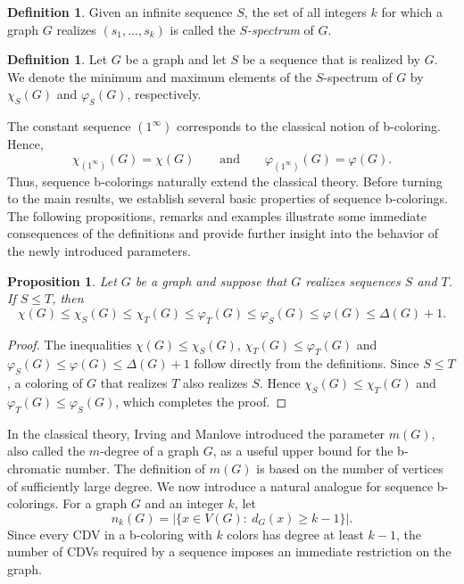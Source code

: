 \documentclass{article}
\newtheorem{proposition}[theorem]{Proposition}
\theoremstyle{definition}
\newtheorem{definition}[theorem]{Definition}
\begin{document}
\begin{definition}
Given an infinite sequence $S$, the set of all integers $k$ for which a graph $G$ realizes $(s_1,\ldots,s_k)$ is called the {\em $S$-spectrum} of $G$.
\end{definition}

\begin{definition}
Let $G$ be a graph and let $S$ be a sequence that is realized by $G$. We denote the minimum and maximum elements of the $S$-spectrum of $G$ by $\chi_S(G)$ and $\varphi_S(G)$, respectively.
\end{definition}

The constant sequence $(1^\infty)$ corresponds to the classical notion of b-coloring. Hence,
$$
\chi_{(1^\infty)}(G)=\chi(G) \qquad \mbox{and}\qquad \varphi_{(1^\infty)}(G)=\varphi(G).
$$
Thus, sequence b-colorings naturally extend the classical theory. Before turning to the main results, we establish several basic properties of sequence b-colorings. The following propositions, remarks and examples illustrate some immediate consequences of the definitions and provide further insight into the behavior of the newly introduced parameters.

\begin{proposition}\label{p:ineqs}
Let $G$ be a graph and suppose that $G$ realizes sequences $S$ and $T$. If $S\leq T$, then
$$\chi(G) \le \chi_S(G) \le \chi_T(G) \le \varphi_T(G) \le \varphi_S(G) \le \varphi(G) \le \Delta(G)+1.$$
\end{proposition}

\begin{proof}
The inequalities $\chi(G)\leq\chi_S(G)$, $\chi_T(G)\leq\varphi_T(G)$ and $\varphi_S(G)\leq\varphi(G)\leq\Delta(G)+1$ follow directly from the definitions.
Since $S\le T$, a coloring of $G$ that realizes $T$ also realizes $S$.
Hence $\chi_S(G)\le \chi_T(G)$ and $\varphi_T(G)\le \varphi_S(G)$, which completes the proof.
\end{proof}

\medskip

In the classical theory, Irving and Manlove \cite{Irving} introduced the parameter $m(G)$, also called the $m$-degree of a graph $G$, as a useful upper bound for the b-chromatic number. The definition of $m(G)$ is based on the number of vertices of sufficiently large degree. We now introduce a natural analogue for sequence b-colorings. For a graph $G$ and an integer $k$, let
$$n_k(G)=\bigl|\{x\in V(G) :\ d_G(x)\ge k-1\}\bigr|.$$
Since every CDV in a b-coloring with $k$ colors has degree at least $k-1$, the number of CDVs required by a sequence imposes an immediate restriction on the graph.
\end{document}
